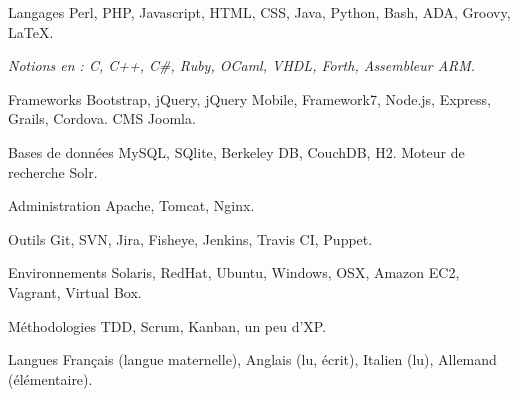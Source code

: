 
\begin{cvskills}

  \cvskill
    {Langages}
    {Perl, PHP, Javascript, HTML, CSS, Java, Python, Bash, ADA, Groovy, LaTeX.
    }

  \cvskill
    {}
    {\textit{Notions en : C, C++, C\#, Ruby, OCaml, VHDL, Forth, Assembleur ARM.}}

  \cvskill
    {Frameworks}
    {Bootstrap, jQuery, jQuery Mobile, Framework7, Node.js, Express, Grails, Cordova. CMS Joomla.}

  \cvskill
    {Bases de données}
    {MySQL, SQlite, Berkeley DB, CouchDB, H2. Moteur de recherche Solr.}

  \cvskill
    {Administration}
    {Apache, Tomcat, Nginx.}

  \cvskill
    {Outils}
    {Git, SVN, Jira, Fisheye, Jenkins, Travis CI, Puppet.}

  \cvskill
    {Environnements}
    {Solaris, RedHat, Ubuntu, Windows, OSX, Amazon EC2, Vagrant, Virtual Box.}

  \cvskill
    {Méthodologies}
    {TDD, Scrum, Kanban, un peu d'XP.}

  \cvskill
    {Langues}
    {Français (langue maternelle), Anglais (lu, écrit), Italien (lu), Allemand (élémentaire).}

\end{cvskills}
